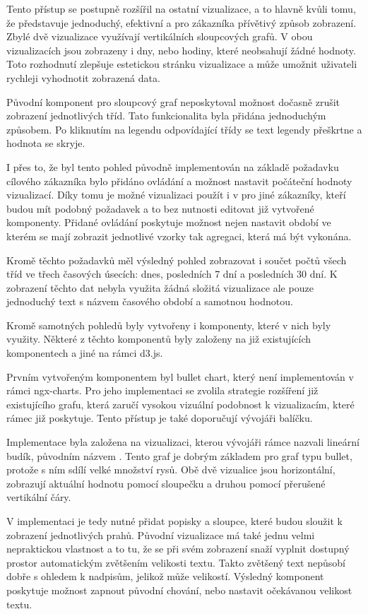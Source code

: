 Tento přístup se postupně rozšířil na ostatní vizualizace, a to hlavně kvůli tomu, že představuje jednoduchý, efektivní a pro zákazníka přívětivý způsob zobrazení. Zbylé dvě vizualizace využívají vertikálních sloupcových grafů. V obou vizualizacích jsou zobrazeny i dny, nebo hodiny, které neobsahují žádné hodnoty. Toto rozhodnutí zlepšuje estetickou stránku vizualizace a může umožnit uživateli rychleji vyhodnotit zobrazená data. 

Původní komponent pro sloupcový graf neposkytoval možnost dočasně zrušit zobrazení jednotlivých tříd. Tato funkcionalita byla přidána jednoduchým způsobem. Po kliknutím na legendu odpovídající třídy se text legendy přeškrtne a hodnota se skryje.

I přes to, že byl tento pohled původně implementován na základě požadavku cílového zákazníka bylo přidáno ovládání a možnost nastavit počáteční hodnoty vizualizací. Díky tomu je možné vizualizaci použít i v pro jiné zákazníky, kteří budou mít podobný požadavek a to bez nutnosti editovat již vytvořené komponenty. Přidané ovládání poskytuje možnost nejen nastavit období ve kterém se mají zobrazit jednotlivé vzorky tak agregaci, která má být vykonána.

Kromě těchto požadavků měl výsledný pohled zobrazovat i součet počtů všech tříd ve třech časových úsecích: dnes, posledních 7 dní a posledních 30 dní. K zobrazení těchto dat nebyla využita žádná složitá vizualizace ale pouze jednoduchý text s názvem časového období a samotnou hodnotou.

Kromě samotných pohledů byly vytvořeny i komponenty, které v nich byly využity. Některé z těchto komponentů byly založeny na již existujících komponentech a jiné na rámci d3.js.

Prvním vytvořeným komponentem byl bullet chart, který není implementován v rámci ngx-charts. Pro jeho implementaci se zvolila strategie rozšíření již existujícího grafu, která zaručí vysokou vizuální podobnost k vizualizacím, které rámec již poskytuje. Tento přístup je také doporučují vývojáři balíčku.

Implementace byla založena na vizualizaci, kterou vývojáři rámce nazvali lineární budík, původním názvem . Tento graf je dobrým základem pro graf typu bullet, protože s ním sdílí velké množství rysů. Obě dvě vizualice jsou horizontální, zobrazují aktuální hodnotu pomocí sloupečku a druhou pomocí přerušené vertikální čáry. 

V implementaci je tedy nutné přidat popisky a sloupce, které budou sloužit k zobrazení jednotlivých prahů. Původní vizualizace má také jednu velmi nepraktickou vlastnost a to tu, že se při svém zobrazení snaží vyplnit dostupný prostor automatickým zvětšením velikosti textu. Takto zvětšený text nepůsobí dobře s ohledem k nadpisům, jelikož může velikostí. Výsledný komponent poskytuje možnost zapnout původní chování, nebo nastavit očekávanou velikost textu.

